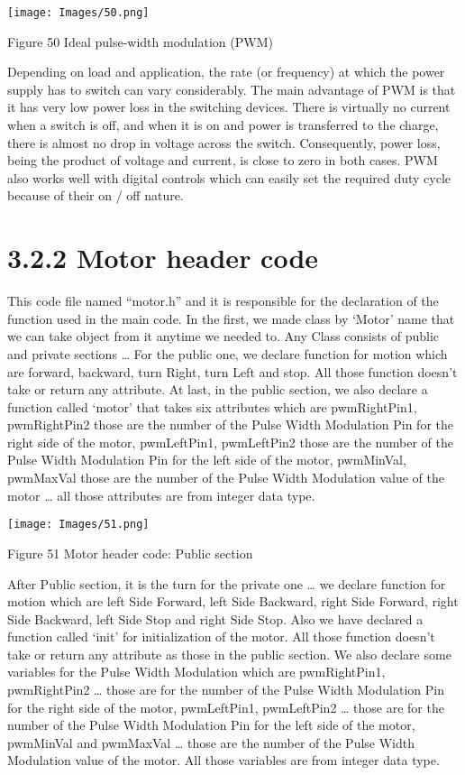 \documentclass{article}
\begin{document}
\begin{center}
    \texttt{[image: Images/50.png]}

    Figure 50 Ideal pulse-width modulation (PWM)
\end{center}

Depending on load and application, the rate (or frequency) at which the power supply has to switch can vary considerably. The main advantage of PWM is that it has very low power loss in the switching devices. There is virtually no current when a switch is off, and when it is on and power is transferred to the charge, there is almost no drop in voltage across the switch. Consequently, power loss, being the product of voltage and current, is close to zero in both cases. PWM also works well with digital controls which can easily set the required duty cycle because of their on / off nature.

\section{3.2.2 Motor header code}

This code file named “motor.h” and it is responsible for the declaration of the function used in the main code. In the first, we made class by ‘Motor’ name that we can take object from it anytime we needed to. Any Class consists of public and private sections … For the public one, we declare function for motion which are forward, backward, turn Right, turn Left and stop. All those function doesn’t take or return any attribute. At last, in the public section, we also declare a function called ‘motor’ that takes six attributes which are pwmRightPin1, pwmRightPin2 those are the number of the Pulse Width Modulation Pin for the right side of the motor, pwmLeftPin1, pwmLeftPin2 those are the number of the Pulse Width Modulation Pin for the left side of the motor, pwmMinVal, pwmMaxVal those are the number of the Pulse Width Modulation value of the motor … all those attributes are from integer data type.

\begin{center}
    \texttt{[image: Images/51.png]}

    Figure 51 Motor header code: Public section
\end{center}

After Public section, it is the turn for the private one … we declare function for motion which are left Side Forward, left Side Backward, right Side Forward, right Side Backward, left Side Stop and right Side Stop. Also we have declared a function called ‘init’ for initialization of the motor.  All those function doesn’t take or return any attribute as those in the public section. We also declare some variables for the Pulse Width Modulation which are pwmRightPin1, pwmRightPin2 … those are for the number of the Pulse Width Modulation Pin for the right side of the motor, pwmLeftPin1, pwmLeftPin2 … those are for the number of the Pulse Width Modulation Pin for the left side of the motor, pwmMinVal and pwmMaxVal … those are the number of the Pulse Width Modulation value of the motor. All those variables are from integer data type.
\end{document}
